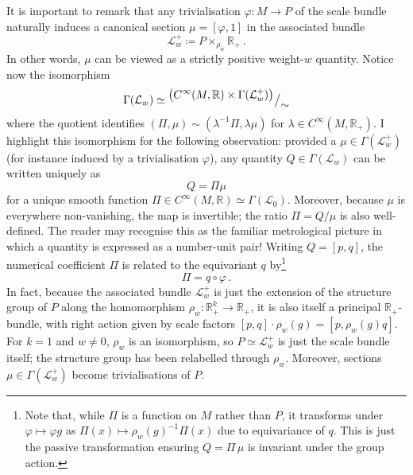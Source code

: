 \documentclass[12pt]{article}
\numberwithin{equation}{section}
\newcommand{\R}{\mathbb{R}}
\begin{document}
It is important to remark that any trivialisation $\varphi\colon M\to P$ of the scale bundle naturally induces a canonical section $\mu = [\varphi,1]$ in the associated bundle
\begin{equation}
    \mathcal{L}_w^+ \coloneqq P\times_{\rho_w}\R_+\,.
\end{equation}
In other words, $\mu$ can be viewed as a strictly positive weight-$w$ quantity. Notice now the isomorphism
\begin{equation}
    \Gamma(\mathcal{L}_w)\simeq {}^{\displaystyle \left(C^\infty(M,\R)\times \Gamma(\mathcal{L}_w^+)\right)} {\big\slash}_{\displaystyle \sim}
\end{equation}
where the quotient identifies $(\Pi,\mu)\sim (\lambda^{-1}\Pi,\lambda\mu)$ for $\lambda\in C^\infty(M,\R_+)$. I highlight this isomorphism for the following observation: provided a ${\mu \in \Gamma(\mathcal{L}_w^+)}$ (for instance induced by a trivialisation $\varphi$), any quantity $Q\in\Gamma(\mathcal{L}_w)$ can be written uniquely as
\begin{equation}
    Q =\Pi \mu
\end{equation}
for a unique smooth function $\Pi \in C^\infty(M,\R)\simeq \Gamma(\mathcal{L}_0)$. Moreover, because $\mu$ is everywhere non-vanishing, the map is invertible; the ratio $\Pi=Q/\mu$ is also well-defined. The reader may recognise this as the familiar metrological picture in which a quantity is expressed as a number-unit pair! Writing $Q=[p,q]$, the numerical coefficient $\Pi$ is related to the equivariant $q$ by\footnote{\label{footnote:Pitransforming}Note that, while $\Pi$ is a function on $M$ rather than $P$, it transforms under $\varphi\mapsto \varphi g$ as $\Pi(x) \mapsto \rho_{w}(g)^{-1}\Pi(x)$ due to equivariance of $q$. This is just the passive transformation ensuring $Q=\Pi\,\mu$ is invariant under the group action.}
\begin{equation}\label{eq:Pi_definition}
    \Pi = q\circ \varphi\,.
\end{equation}
In fact, because the associated bundle $\mathcal{L}_w^+$ is just the extension of the structure group of $P$ along the homomorphism $\rho_w\colon \R_+^k\to \R_+$, it is also itself a principal $\R_+$-bundle, with right action given by scale factors $[p,q]\cdot \rho_w(g) = [p,\rho_w(g)q]$. For $k=1$ and $w\neq 0$, $\rho_w$ is an isomorphism, so $P\simeq \mathcal{L}_w^+$ is just the scale bundle itself; the structure group has been relabelled through $\rho_w$. Moreover, sections $\mu\in\Gamma(\mathcal{L}_w^+)$ become trivialisations of $P$.
\end{document}
